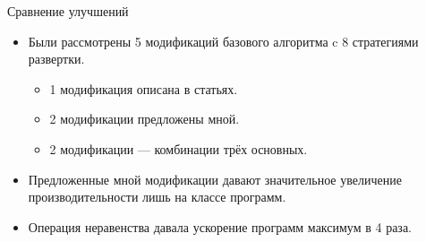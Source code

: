 \documentclass[xcolor=table]{beamer}
\begin{document}
%
\begin{frame}{Сравнение улучшений}

\begin{itemize}
\item Были рассмотрены 5 модификаций базового алгоритма
      c 8 стратегиями развертки.
      \begin{itemize}
      \item 1 модификация описана в статьях.
      \item 2 модификации предложены мной.
      \item 2 модификации --- комбинации трёх основных.
      \end{itemize}
\item Предложенные мной модификации давают значительное увеличение
      производительности лишь на классе программ.
\item Операция неравенства давала ускорение программ максимум в 4 раза.
\end{itemize}

\end{frame}
%
\end{document}
